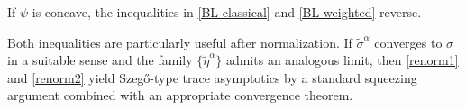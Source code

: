 \documentclass{amsart}
\theoremstyle{definition}
\theoremstyle{remark}
\numberwithin{equation}{section}
\newcommand{\ip}[2]{\left\langle {#1} , {#2} \right\rangle} %
\begin{document}
\medskip

If $\psi$ is concave, the inequalities in
\eqref{BL-classical} and \eqref{BL-weighted} reverse.

\medskip

\noindent
Both inequalities are particularly useful after normalization.
If $\widetilde{\sigma}^\alpha$ converges to $\sigma$
in a suitable sense and the family
$\{\widetilde{\eta}^\alpha\}$ admits an analogous limit,
then \eqref{renorm1} and \eqref{renorm2}
yield Szeg\H{o}-type trace asymptotics by a standard squeezing argument
combined with an appropriate convergence theorem.

\end{document}
